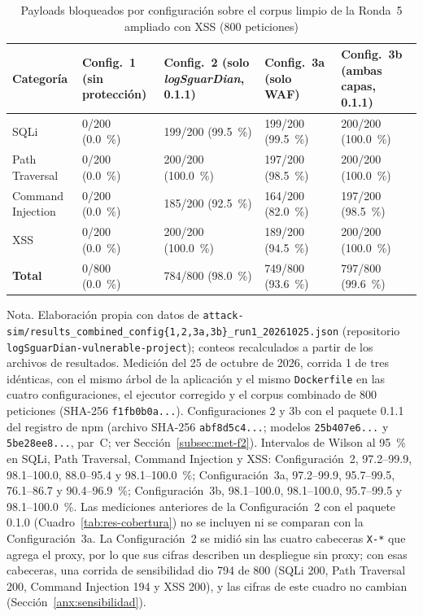 \begin{table}[H]
\centering
\small
\begin{tabular}{|L{2.7cm}|L{2.0cm}|L{2.6cm}|L{2.6cm}|L{2.6cm}|}
\hline
\textbf{Categoría} & \textbf{Config.~1 (sin protección)} & \textbf{Config.~2 (solo \textit{logSguarDian}, 0.1.1)} & \textbf{Config.~3a (solo WAF)} & \textbf{Config.~3b (ambas capas, 0.1.1)} \\ \hline
SQLi & 0/200 (0.0~\%) & 199/200 (99.5~\%) & 199/200 (99.5~\%) & 200/200 (100.0~\%) \\ \hline
Path Traversal & 0/200 (0.0~\%) & 200/200 (100.0~\%) & 197/200 (98.5~\%) & 200/200 (100.0~\%) \\ \hline
Command Injection & 0/200 (0.0~\%) & 185/200 (92.5~\%) & 164/200 (82.0~\%) & 197/200 (98.5~\%) \\ \hline
XSS & 0/200 (0.0~\%) & 200/200 (100.0~\%) & 189/200 (94.5~\%) & 200/200 (100.0~\%) \\ \hline
\textbf{Total} & 0/800 (0.0~\%) & 784/800 (98.0~\%) & 749/800 (93.6~\%) & 797/800 (99.6~\%) \\ \hline
\end{tabular}
\caption[Cuatro configuraciones sobre el corpus limpio de la Ronda 5 con XSS]{Payloads bloqueados por configuración sobre el corpus limpio de la Ronda~5 ampliado con XSS (800 peticiones)}
\label{tab:res-ronda5}
\end{table}
{\footnotesize Nota. Elaboración propia con datos de
\texttt{attack-sim/results\_combined\_config\{1,2,3a,3b\}\_run1\_20261025.json} (repositorio
\texttt{logSguarDian-vulnerable-project}); conteos recalculados a partir de los archivos de
resultados. Medición del 25 de octubre de 2026, corrida 1 de tres idénticas, con el mismo árbol de
la aplicación y el mismo \texttt{Dockerfile} en las cuatro configuraciones, el ejecutor corregido y
el corpus combinado de 800 peticiones (SHA-256 \texttt{f1fb0b0a...}). Configuraciones 2 y 3b con el
paquete 0.1.1 del registro de npm (archivo SHA-256 \texttt{abf8d5c4...}; modelos \texttt{25b407e6...}
y \texttt{5be28ee8...}, par~C; ver Sección~\ref{subsec:met-f2}). Intervalos de Wilson al 95~\% en
SQLi, Path Traversal, Command Injection y XSS: Configuración~2, 97.2--99.9, 98.1--100.0,
88.0--95.4 y 98.1--100.0~\%; Configuración~3a, 97.2--99.9, 95.7--99.5, 76.1--86.7 y 90.4--96.9~\%;
Configuración~3b, 98.1--100.0, 98.1--100.0, 95.7--99.5 y 98.1--100.0~\%. Las mediciones anteriores
de la Configuración~2 con el paquete 0.1.0 (Cuadro~\ref{tab:res-cobertura}) no se incluyen ni se
comparan con la Configuración~3a. La Configuración~2 se midió sin las cuatro cabeceras
\texttt{X-*} que agrega el proxy, por lo que sus cifras describen un despliegue sin proxy; con esas
cabeceras, una corrida de sensibilidad dio 794 de 800 (SQLi 200, Path Traversal 200, Command
Injection 194 y XSS 200), y las cifras de este cuadro no cambian (Sección~\ref{anx:sensibilidad}).}

